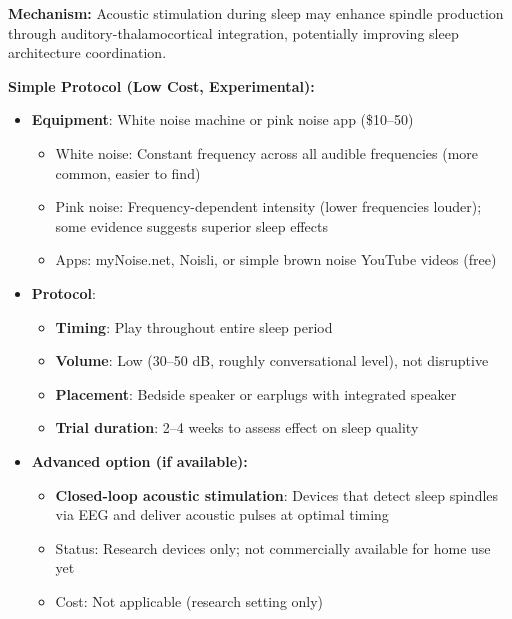 \begin{recommendation}
\label{rec:sleep-spindle-severe}

\textbf{Mechanism:} Acoustic stimulation during sleep may enhance spindle production through auditory-thalamocortical integration, potentially improving sleep architecture coordination.

\textbf{Simple Protocol (Low Cost, Experimental):}

\begin{itemize}
    \item \textbf{Equipment}: White noise machine or pink noise app (\$10--50)
    \begin{itemize}
        \item White noise: Constant frequency across all audible frequencies (more common, easier to find)
        \item Pink noise: Frequency-dependent intensity (lower frequencies louder); some evidence suggests superior sleep effects
        \item Apps: myNoise.net, Noisli, or simple brown noise YouTube videos (free)
    \end{itemize}

    \item \textbf{Protocol}:
    \begin{itemize}
        \item \textbf{Timing}: Play throughout entire sleep period
        \item \textbf{Volume}: Low (30--50 dB, roughly conversational level), not disruptive
        \item \textbf{Placement}: Bedside speaker or earplugs with integrated speaker
        \item \textbf{Trial duration}: 2--4 weeks to assess effect on sleep quality
    \end{itemize}

    \item \textbf{Advanced option (if available):}
    \begin{itemize}
        \item \textbf{Closed-loop acoustic stimulation}: Devices that detect sleep spindles via EEG and deliver acoustic pulses at optimal timing
        \item Status: Research devices only; not commercially available for home use yet
        \item Cost: Not applicable (research setting only)
    \end{itemize}


\end{itemize}
\end{recommendation}
